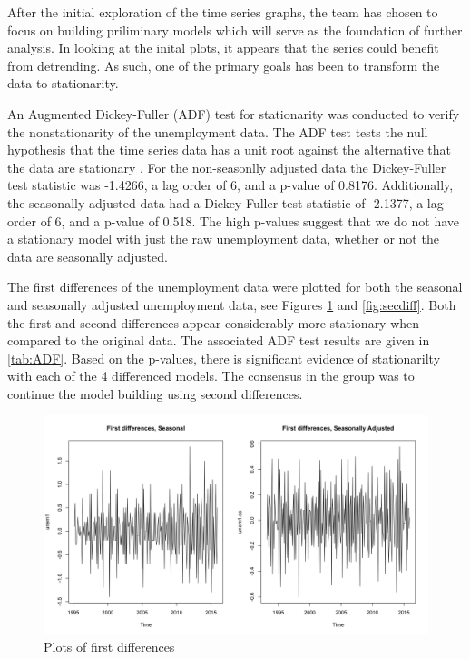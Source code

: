 {			After the initial exploration of the time series graphs, the team has chosen to focus on building priliminary models which will serve as the foundation of further analysis. In looking at the inital plots, it appears that the series could benefit from detrending. As such, one of the primary goals has been to transform the data to stationarity. \newline
			
			An Augmented Dickey-Fuller (ADF) test for stationarity was conducted to verify the nonstationarity of the unemployment data.  The ADF test tests the null hypothesis that the time series data has a unit root against the alternative that the data are stationary \citep{shumway2010time}. For the non-seasonlly adjusted data the Dickey-Fuller test statistic was -1.4266, a lag order of 6, and a p-value of 0.8176. Additionally, the seasonally adjusted data had a Dickey-Fuller test statistic of -2.1377, a lag order of 6, and a p-value of 0.518. The high p-values suggest that we do not have a stationary model with just the raw unemployment data, whether or not the data are seasonally adjusted.\newline
			
		 The first differences of the unemployment data were plotted for both the seasonal and seasonally adjusted unemployment data, see Figures \ref{fig:firstdiff} and \ref{fig:secdiff}. Both the first and second differences appear considerably more stationary when compared to the original data. The associated ADF test results are given in \ref{tab:ADF}. Based on the p-values, there is significant evidence of stationarilty with each of the 4 differenced models. The consensus in the group was to continue the model building using second differences.
		 
	
		 \begin{figure}[H]
							\centering
							\includegraphics[width=.6\linewidth]{images/firstdiff}
							\caption{Plots of first differences}
							\label{fig:firstdiff}
						\end{figure}
						
}
